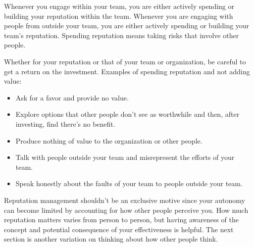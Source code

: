 Whenever you engage within your team, you are either actively spending or building your reputation within the team.
Whenever you are engaging with people from outside your team, you are either actively spending or building your team's reputation.
Spending reputation means taking risks that involve other people.


Whether for your reputation or that of your team or organization, be careful to get a return on the investment. 
Examples of spending reputation and not adding value:
\begin{itemize}
    \item Ask for a favor and provide no value.
    \item Explore options that other people don't see as worthwhile and then, after investing, find there's no benefit.
    \item Produce nothing of value to the organization or other people.
    \item Talk with people outside your team and misrepresent the efforts of your team.
    \item Speak honestly about the faults of your team to people outside your team.
\end{itemize}












Reputation management shouldn't be an exclusive motive since your autonomy can become limited by accounting for how other people perceive you. How much reputation matters varies from person to person, but having awareness of the concept and potential consequence of your effectiveness is helpful. The next section is another variation on thinking about how other people think. 

